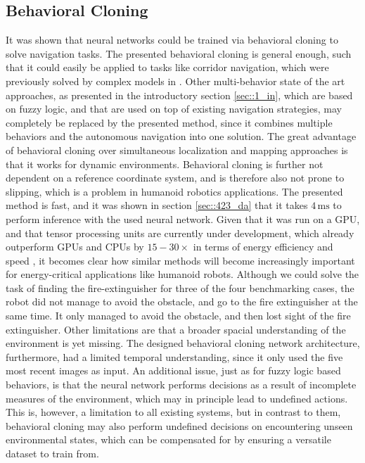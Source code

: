 \subsection{Behavioral Cloning}
It was shown that neural networks could be trained via behavioral cloning to solve navigation tasks. The presented behavioral cloning is general enough, such that it could easily be applied to tasks like corridor navigation, which were previously solved by complex models in \cite{faragasso2013vision}. Other multi-behavior state of the art approaches, as presented in the introductory section \ref{sec::1_in}, which are based on fuzzy logic, and that are used on top of existing navigation strategies, may completely be replaced by the presented method, since it combines multiple behaviors and the autonomous navigation into one solution. The great advantage of behavioral cloning over simultaneous localization and mapping approaches is that it works for dynamic environments. Behavioral cloning is further not dependent on a reference coordinate system, and is therefore also not prone to slipping, which is a problem in humanoid robotics applications. The presented method is fast, and it was shown in section \ref{sec::423_da} that it takes $4\,\text{ms}$ to perform inference with the used neural network. Given that it was run on a GPU, and that tensor processing units are currently under development, which already outperform GPUs and CPUs by $15-30\times$ in terms of energy efficiency and speed \cite{jouppi2017datacenter}, it becomes clear how similar methods will become increasingly important for energy-critical applications like humanoid robots. Although we could solve the task of finding the fire-extinguisher for three of the four benchmarking cases, the robot did not manage to avoid the obstacle, and go to the fire extinguisher at the same time. It only managed to avoid the obstacle, and then lost sight of the fire extinguisher. Other limitations are that a broader spacial understanding of the environment is yet missing. The designed behavioral cloning network architecture, furthermore, had a limited temporal understanding, since it only used the five most recent images as input. An additional issue, just as for fuzzy logic based behaviors, is that the neural network performs decisions as a result of incomplete measures of the environment, which may in principle lead to undefined actions. This is, however, a limitation to all existing systems, but in contrast to them, behavioral cloning may also perform undefined decisions on encountering unseen environmental states, which can be compensated for by ensuring a versatile dataset to train from.
